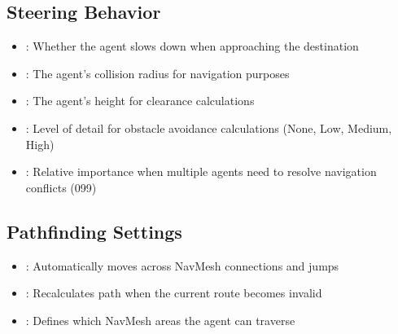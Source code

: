 \documentclass[letterpaper,10pt,english]{jupyterBook}
\begin{document}
\subsection{Steering Behavior}
\label{\detokenize{Navmesh Agent:steering-behavior}}\begin{itemize}
\item {} 
\sphinxAtStartPar
{}: Whether the agent slows down when approaching the destination

\item {} 
\sphinxAtStartPar
{}: The agent’s collision radius for navigation purposes

\item {} 
\sphinxAtStartPar
{}: The agent’s height for clearance calculations

\item {} 
\sphinxAtStartPar
{}: Level of detail for obstacle avoidance calculations (None, Low, Medium, High)

\item {} 
\sphinxAtStartPar
{}: Relative importance when multiple agents need to resolve navigation conflicts (0\sphinxhyphen{}99)

\end{itemize}


\subsection{Pathfinding Settings}
\label{\detokenize{Navmesh Agent:pathfinding-settings}}\begin{itemize}
\item {} 
\sphinxAtStartPar
{}: Automatically moves across NavMesh connections and jumps

\item {} 
\sphinxAtStartPar
{}: Recalculates path when the current route becomes invalid

\item {} 
\sphinxAtStartPar
{}: Defines which NavMesh areas the agent can traverse

\end{itemize}
\end{document}
